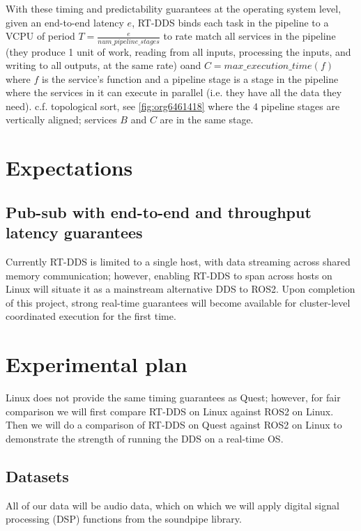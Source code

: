 \documentclass[11pt]{article}
\begin{document}
With these timing and predictability guarantees at the operating system level,
given an end-to-end latency \(e\), RT-DDS binds each task in the pipeline to a
VCPU of period \(T=\frac{e}{num\_pipeline\_stages}\) to rate match all services
in the pipeline (they produce 1 unit of work, reading from all inputs, processing
the inputs, and writing to all outputs, at the same rate)
oand \(C=max\_execution\_time(f)\)
where \(f\) is the service's function and a pipeline stage is a stage in the
pipeline where the services in it can execute in parallel (i.e. they have all the
data they need). c.f. topological sort, see \ref{fig:org6461418} where the 4 pipeline stages are
vertically aligned; services \(B\) and \(C\) are in the same stage.
\section{Expectations}
\label{sec:org9798293}
\subsection{Pub-sub with end-to-end and throughput latency guarantees}
\label{sec:orgf82a1f2}
Currently RT-DDS is limited to a single host, with
data streaming across shared memory communication; however, enabling RT-DDS to
span across hosts on Linux will situate it as a mainstream alternative DDS to
ROS2. Upon completion of this project, strong real-time guarantees will become
available for cluster-level coordinated execution for the first time.
\section{Experimental plan}
\label{sec:org1467aa6}
Linux does not provide the same timing guarantees as Quest; however, for fair
comparison we will first compare RT-DDS on Linux against ROS2 on Linux. Then
we will do a comparison of RT-DDS on Quest against ROS2 on Linux to demonstrate
the strength of running the DDS on a real-time OS.
\subsection{Datasets}
\label{sec:orga168572}
All of our data will be audio data, which on which we will apply digital
signal processing (DSP) functions from the soundpipe library. 
\end{document}

